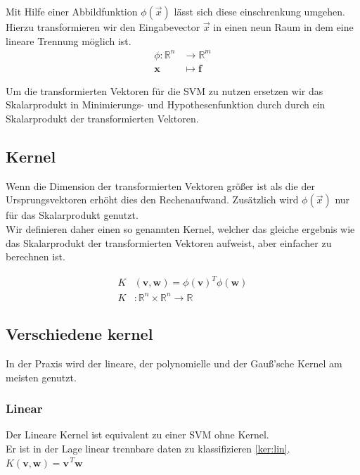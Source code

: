 \documentclass[10pt,a4paper]{scrartcl}
\begin{document}
                Mit Hilfe einer Abbildfunktion $\phi(\vec{x})$ lässt sich diese einschrenkung umgehen. Hierzu transformieren wir den Eingabevector $\vec{x}$ in einen neun Raum in dem eine lineare Trennung möglich ist. \\
                
                \begin{align*}
                    \phi: \mathbb{R}^{n} & \to \mathbb{R}^{m} \\
                    \boldsymbol{x} & \mapsto \boldsymbol{f}
                \end{align*}
                
                Um die transformierten Vektoren für die SVM zu nutzen ersetzen wir das Skalarprodukt in Minimierungs- und Hypothesenfunktion durch durch ein Skalarprodukt der transformierten Vektoren. \\
                
            \subsection{Kernel}
                Wenn die Dimension der transformierten Vektoren größer ist als die der Ursprungsvektoren erhöht dies den Rechenaufwand.
                Zusätzlich wird $\phi(\vec{x})$ nur für das Skalarprodukt genutzt. \\
                
                Wir definieren daher einen so genannten Kernel, welcher das gleiche ergebnis wie das Skalarprodukt der transformierten Vektoren aufweist, aber einfacher zu berechnen ist.
                
                \begin{align*}
                    K&(\boldsymbol{v}, \boldsymbol{w}) = \phi(\boldsymbol{v})^{T} \phi(\boldsymbol{w})\\
                    K&: \mathbb{R}^n \times \mathbb{R}^n \rightarrow \mathbb{R}
                \end{align*}
                
            \subsection{Verschiedene kernel}
                In der Praxis wird der lineare, der polynomielle und der Gauß'sche Kernel am meisten genutzt.
                \subsubsection{Linear}
                    Der Lineare Kernel ist equivalent zu einer SVM ohne Kernel. \\
                    Er ist in der Lage linear trennbare daten zu klassifizieren \ref{ker:lin}. \\
                    $K(\boldsymbol{v}, \boldsymbol{w}) = \boldsymbol{v}^{\, T} \boldsymbol{w}$
                
\end{document}
